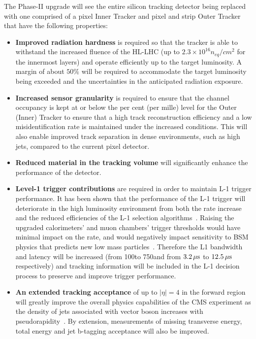 The Phase-II upgrade will see the entire silicon tracking detector being replaced with one comprised of a pixel Inner Tracker and pixel and strip Outer Tracker that have the following properties:
\begin{itemize}
\item \textbf{Improved radiation hardness} is required so that the tracker is able to withstand the increased fluence of the HL-LHC (up to $2.3\times10^{16} n_{eq}/cm^{2}$ for the innermost layers) and operate efficiently up to the target luminosity. A margin of about $50\%$ will be required to accommodate the target luminosity being exceeded and the uncertainties in the anticipated radiation exposure.
\item \textbf{Increased sensor granularity} is required to ensure that the channel occupancy is kept at or below the per cent (per mille) level for the Outer (Inner) Tracker to ensure that a high track reconstruction efficiency and a low misidentification rate is maintained under the increased \PU conditions. This will also enable improved track separation in dense environments, such as high \pT jets, compared to the current pixel detector.
\item \textbf{Reduced material in the tracking volume} will significantly enhance the performance of the detector.
\item \textbf{Level-1 trigger contributions} are required in order to maintain L-1 trigger performance. It has been shown that the performance of the L-1 trigger will deteriorate in the high luminosity environment from both the rate increase and the reduced efficiencies of the L-1 selection algorithms~\cite{CMSCollaboration:2015zni}.
Raising the upgraded calorimeters' and muon chambers' trigger thresholds would have minimal impact on the rate, and would negatively impact sensitivity to BSM physics that predicts new low mass particles~\cite{CMSCollaboration:2015zni}.
Therefore the L1 bandwidth and latency will be increased (from 100\kHz to 750\kHz and from $3.2\,\mu\text{s}$ to $12.5\,\mu\text{s}$ respectively) and tracking information will be included in the L-1 decision process to preserve and improve trigger performance.
\item \textbf{An extended tracking acceptance} of  up to $|\eta| = 4$ in the forward region will greatly improve the overall physics capabilities of the CMS experiment as the density of jets associated with vector boson increases with pseudorapidity~\cite{CMS_Upgrade_TP}. By extension, measurements of missing transverse energy, total energy and jet b-tagging acceptance will also be improved.
\end{itemize}

